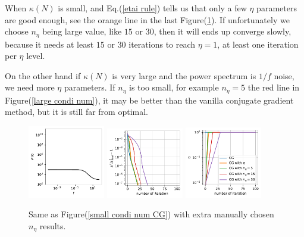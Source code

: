 \documentclass[twocolumn,linenumbers]{aastex631}
\begin{document}
When $\kappa(N)$ is small, and Eq.(\ref{etai rule}) tells us that only a few
$\eta$ parameters are good enough, see the orange line in the last Figure(\ref{small condi num}).
If unfortunately we choose $n_{\eta}$ being large value, like $15$ or $30$,
then it will ends up converge slowly, because it needs at least $15$ or $30$
iterations to reach $\eta=1$, at least one iteration per $\eta$ level.

On the other hand if $\kappa(N)$ is very large and the power spectrum is $1/f$
noise, we need more $\eta$ parameters.
If $n_{\eta}$ is too small, for example $n_{\eta}=5$ the red line in
Figure(\ref{large condi num}), it may be better than the vanilla conjugate
gradient method, but it is still far from optimal.


\begin{figure}[htb!]
\centering
\includegraphics[width=0.3\textwidth]{0.1/small_condition_num/P_f.pdf}
\includegraphics[width=0.3\textwidth]{0.1/small_condition_num/chi2.pdf}
\includegraphics[width=0.3\textwidth]{0.1/small_condition_num/eta.pdf}
\caption{Same as Figure(\ref{small condi num CG}) with extra manually chosen 
    $n_{\eta}$ results.
}
\label{small condi num}
\end{figure}
\end{document}
